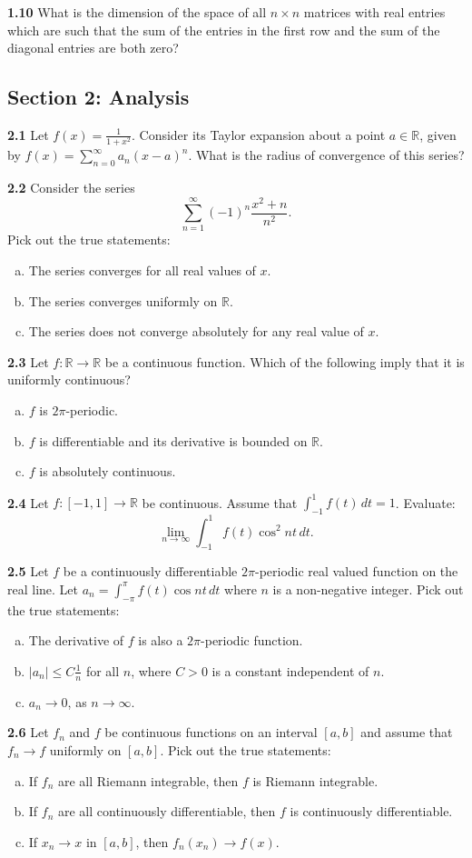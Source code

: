 \documentclass[11pt,a4paper]{article}
\newcommand{\R}{\mathbb{R}}
\newcommand{\examsec}[1]{%
  \subsection*{#1}
  \vspace{-2pt}
}
\newcommand{\qitem}[1]{\par\medskip\noindent\textbf{#1}\hspace{0.5em}}
\begin{document}
\qitem{1.10} What is the dimension of the space of all $n \times n$ matrices with real entries which are such that the sum of the entries in the first row and the sum of the diagonal entries are both zero?

\examsec{Section 2: Analysis}

\qitem{2.1} Let $f(x) = \frac{1}{1+x^2}$. Consider its Taylor expansion about a point $a \in \R$, given by $f(x) = \sum_{n=0}^{\infty} a_n(x - a)^n$. What is the radius of convergence of this series?

\qitem{2.2} Consider the series
\[
  \sum_{n=1}^{\infty} (-1)^n \frac{x^2 + n}{n^2}.
\]
Pick out the true statements:
\begin{enumerate}[(a)]
  \item The series converges for all real values of $x$.
  \item The series converges uniformly on $\R$.
  \item The series does not converge absolutely for any real value of $x$.
\end{enumerate}

\qitem{2.3} Let $f : \R \to \R$ be a continuous function. Which of the following imply that it is uniformly continuous?
\begin{enumerate}[(a)]
  \item $f$ is $2\pi$-periodic.
  \item $f$ is differentiable and its derivative is bounded on $\R$.
  \item $f$ is absolutely continuous.
\end{enumerate}

\qitem{2.4} Let $f : [-1, 1] \to \R$ be continuous. Assume that $\int_{-1}^{1} f(t)\,dt = 1$. Evaluate:
\[
  \lim_{n \to \infty} \int_{-1}^{1} f(t)\cos^2 nt\,dt.
\]

\qitem{2.5} Let $f$ be a continuously differentiable $2\pi$-periodic real valued function on the real line. Let $a_n = \int_{-\pi}^{\pi} f(t)\cos nt\,dt$ where $n$ is a non-negative integer. Pick out the true statements:
\begin{enumerate}[(a)]
  \item The derivative of $f$ is also a $2\pi$-periodic function.
  \item $|a_n| \le C\frac{1}{n}$ for all $n$, where $C > 0$ is a constant independent of $n$.
  \item $a_n \to 0$, as $n \to \infty$.
\end{enumerate}

\qitem{2.6} Let $f_n$ and $f$ be continuous functions on an interval $[a, b]$ and assume that $f_n \to f$ uniformly on $[a, b]$. Pick out the true statements:
\begin{enumerate}[(a)]
  \item If $f_n$ are all Riemann integrable, then $f$ is Riemann integrable.
  \item If $f_n$ are all continuously differentiable, then $f$ is continuously differentiable.
  \item If $x_n \to x$ in $[a, b]$, then $f_n(x_n) \to f(x)$.
\end{enumerate}
\end{document}

